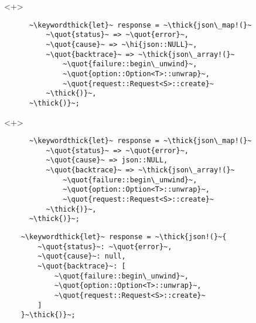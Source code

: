 \documentclass[usepdftitle=false,aspectratio=169]{beamer}
\newcommand{\thick}[1]{\contourlength{0.16pt}\contour[10]{black}{#1}}
\newcommand{\slantbox}[2][.5]
  {%
    \mbox
      {%
        \sbox{\foobox}{#2}%
        \hskip\wd\foobox
        \pdfsave
        \pdfsetmatrix{1 0 #1 1}%
        \llap{\usebox{\foobox}}%
        \pdfrestore
      }%
  }
\newcommand{\backslantbox}[2][.5]
  {%
    \mbox
      {%
        \sbox{\foobox}{#2}%
        \hskip\wd\foobox
        \pdfsave
        \pdfsetmatrix{-1 0 #1 1}%
        \llap{\usebox{\foobox}}%
        \pdfrestore
      }%
  }
\newcommand{\hi}[1]{%
\tikz[baseline=(A.base)]
 \node[highlighting=yellowbg,inner sep=0pt,text depth=0pt] (A) {#1};%
}
\newcommand{\openquote}{\backslantbox[.2]{\hspace{11pt}''\hspace{-11pt}}}
\newcommand{\closequote}{\slantbox[-.2]{\hspace{2pt}''\hspace{-2pt}}}
\newcommand{\blackquote}[1]{\openquote#1\closequote}
\newcommand{\quot}[1]{{\color{redish}\blackquote{#1}}}
\newcommand{\keywordthick}[1]{\color{greenish}\contourlength{0.20pt}\contour[10]{greenish}{#1}}
\begin{document}
\begin{frame}[fragile]
  \begin{onlyenv}<+>
    \begin{verbatim}
      ~\keywordthick{let}~ response = ~\thick{json\_map!(}~
          ~\quot{status}~ => ~\quot{error}~,
          ~\quot{cause}~ => ~\hi{json::NULL}~,
          ~\quot{backtrace}~ => ~\thick{json\_array!(}~
              ~\quot{failure::begin\_unwind}~,
              ~\quot{option::Option<T>::unwrap}~,
              ~\quot{request::Request<S>::create}~
          ~\thick{)}~,
      ~\thick{)}~;
    \end{verbatim}
  \end{onlyenv}
  \begin{onlyenv}<+>
    \begin{verbatim}
      ~\keywordthick{let}~ response = ~\thick{json\_map!(}~
          ~\quot{status}~ => ~\quot{error}~,
          ~\quot{cause}~ => json::NULL,
          ~\quot{backtrace}~ => ~\thick{json\_array!(}~
              ~\quot{failure::begin\_unwind}~,
              ~\quot{option::Option<T>::unwrap}~,
              ~\quot{request::Request<S>::create}~
          ~\thick{)}~,
      ~\thick{)}~;
    \end{verbatim}
  \end{onlyenv}
\end{frame}

\begin{frame}[fragile]
  \begin{verbatim}
    ~\keywordthick{let}~ response = ~\thick{json!(}~{
        ~\quot{status}~: ~\quot{error}~,
        ~\quot{cause}~: null,
        ~\quot{backtrace}~: [
            ~\quot{failure::begin\_unwind}~,
            ~\quot{option::Option<T>::unwrap}~,
            ~\quot{request::Request<S>::create}~
        ]
    }~\thick{)}~;
  \end{verbatim}
\end{frame}
\end{document}
